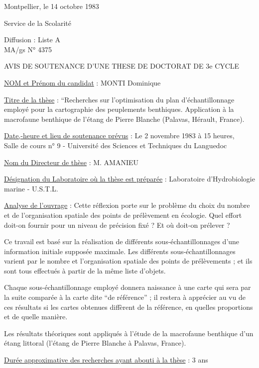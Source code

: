 Montpellier, le 14 octobre 1983

Service de la Scolarité

Diffusion : Liste A\\
MA/gs \hfill N° 4375

\begin{center}
AVIS DE SOUTENANCE D'UNE THESE DE DOCTORAT DE 3e CYCLE

\end{center}

\uline{NOM et Prénom du candidat} : MONTI Dominique

\uline{Titre de la thèse} : ``Recherches sur l'optimisation du plan d'échantillonnage employé pour la cartographie des peuplements benthiques. Application à la macrofaune benthique de l'étang de Pierre Blanche (Palavas, Hérault, France).

\uline{Date,-heure et lieu de soutenance prévus} : Le 2 novembre 1983 à 15 heures,\\
Salle de cours n° 9 - Université des Sciences et Techniques du Languedoc

\uline{Nom du Directeur de thèse} : M. AMANIEU

\uline{Désignation du Laboratoire où la thèse est préparée} : Laboratoire d'Hydrobiologie marine - U.S.T.L.

\uline{Analyse de l'ouvrage} : Cette réflexion porte sur le problème du choix du nombre et de l'organisation spatiale des points de prélèvement en écologie. Quel effort doit-on fournir pour un niveau de précision fixé ? Et où doit-on prélever ?

Ce travail est basé sur la réalisation de différents sous-échantillonnages d'une information initiale supposée maximale. Les différents sous-échantillonnages varient par le nombre et l'organisation spatiale des points de prélèvements ; et ils sont tous effectués à partir de la même liste d'objets.

Chaque sous-échantillonnage employé donnera naissance à une carte qui sera par la suite comparée à la carte dite ``de référence'' ; il restera à apprécier au vu de ces résultats si les cartes obtenues diffèrent de la référence, en quelles proportions et de quelle manière.

Les résultats théoriques sont appliqués à l'étude de la macrofaune benthique d'un étang littoral (l'étang de Pierre Blanche à Palavas, France).

\uline{Durée approximative des recherches ayant abouti à la thèse} : 3 ans

